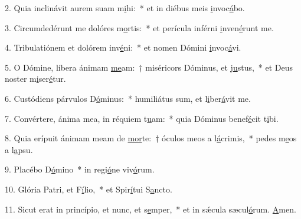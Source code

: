 2. Quia inclinávit aurem suam m\uline{i}hi:~* et in diébus meis \uline{i}nvoc\uline{á}bo.\par 
3. Circumdedérunt me dolóres m\uline{o}rtis:~* et perícula inférni \uline{i}nven\uline{é}runt me.\par 
4. Tribulatiónem et dolórem inv\uline{é}ni:~* et nomen Dómini \uline{i}nvoc\uline{á}vi.\par 
5. O Dómine, líbera ánimam \uline{me}am:~† miséricors Dóminus, et j\uline{u}stus,~* et Deus noster m\uline{i}ser\uline{é}tur.\par 
6. Custódiens párvulos D\uline{ó}minus:~* humiliátus sum, et l\uline{i}ber\uline{á}vit me.\par 
7. Convértere, ánima mea, in réquiem t\uline{u}am:~* quia Dóminus benef\uline{é}cit t\uline{i}bi.\par 
8. Quia erípuit ánimam meam de \uline{mor}te:~† óculos meos a l\uline{á}crimis,~* pedes m\uline{e}os a l\uline{a}psu.\par 
9. Placébo D\uline{ó}mino~* in regi\uline{ó}ne viv\uline{ó}rum.\par 
10. Glória Patri, et F\uline{í}lio,~* et Spir\uline{í}tui S\uline{a}ncto.\par 
11. Sicut erat in princípio, et nunc, et s\uline{e}mper,~* et in sǽcula sæcul\uline{ó}rum. \uline{A}men.\par 
